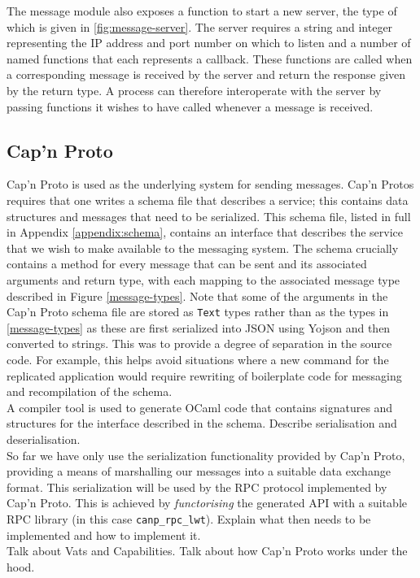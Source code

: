 The message module also exposes a function to start a new server, the type of which is given in \ref{fig:message-server}. The server requires a string and integer representing the IP address and port number on which to listen and a number of named functions that each represents a callback. These functions are called when a corresponding message is received by the server and return the response given by the return type. A process can therefore interoperate with the server by passing functions it wishes to have called whenever a message is received. \\

\subsection{Cap'n Proto}

Cap'n Proto is used as the underlying system for sending messages. Cap'n Protos requires that one writes a schema file that describes a service; this contains data structures and messages that need to be serialized. This schema file, listed in full in Appendix \ref{appendix:schema}, contains an interface that describes the service that we wish to make available to the messaging system. The schema crucially contains a method for every message that can be sent and its associated arguments and return type, with each mapping to the associated message type described in Figure \ref{message-types}. Note that some of the arguments in the Cap'n Proto schema file are stored as \texttt{Text} types rather than as the types in \ref{message-types} as these are first serialized into JSON using Yojson and then converted to strings. This was to provide a degree of separation in the source code. For example, this helps avoid situations where a new command for the replicated application would require rewriting of boilerplate code for messaging and recompilation of the schema. \\

{\color{red}A compiler tool is used to generate OCaml code that contains signatures and structures for the interface described in the schema. Describe serialisation and deserialisation. \\

So far we have only use the serialization functionality provided by Cap'n Proto, providing a means of marshalling our messages into a suitable data exchange format. This serialization will be used by the RPC protocol implemented by Cap'n Proto. This is achieved by \emph{functorising} the generated API with a suitable RPC library (in this case \texttt{canp\_rpc\_lwt}). {\color{red}Explain what then needs to be implemented and how to implement it.} \\

Talk about Vats and Capabilities. Talk about how Cap'n Proto works under the hood.}\\

